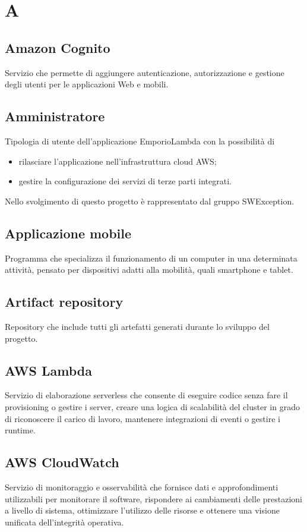 \section*{A}
\subsection*{Amazon Cognito}
Servizio che permette di aggiungere autenticazione, autorizzazione e gestione degli utenti per le applicazioni Web e mobili.

\subsection*{Amministratore}
Tipologia di utente dell'applicazione EmporioLambda con la possibilità di
\begin{itemize}
    \item rilasciare l'applicazione nell'infrastruttura cloud AWS;
    \item gestire la configurazione dei servizi di terze parti integrati.
\end{itemize}
Nello svolgimento di questo progetto è rappresentato dal gruppo SWException.

\subsection*{Applicazione mobile}
Programma che specializza il funzionamento di un computer in una determinata attività, pensato per dispositivi adatti alla mobilità, quali smartphone e tablet.

\subsection*{Artifact repository}
Repository che include tutti gli artefatti generati durante lo sviluppo del progetto.

\subsection*{AWS Lambda}
Servizio di elaborazione serverless che consente di eseguire codice senza fare il provisioning o gestire i server, creare una logica di scalabilità del cluster in grado di riconoscere il carico di lavoro, mantenere integrazioni di eventi o gestire i runtime.

\subsection*{AWS CloudWatch}
Servizio di monitoraggio e osservabilità che fornisce dati e approfondimenti utilizzabili per monitorare il software, rispondere ai cambiamenti delle prestazioni a livello di sistema, ottimizzare l'utilizzo delle risorse e ottenere una visione unificata dell'integrità operativa.

